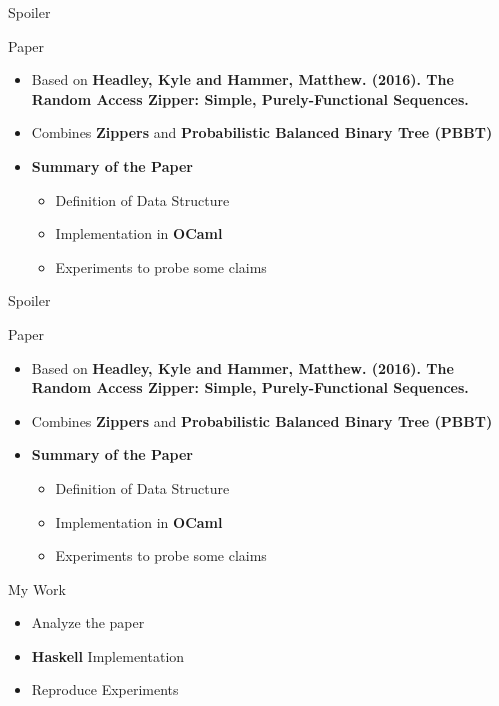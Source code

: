\documentclass{beamer}
\begin{document}
\begin{frame}[fragile]{Spoiler}

  \begin{block}{Paper}
    \begin{itemize}
      \item Based on \textbf{Headley, Kyle and Hammer, Matthew. (2016). The Random Access Zipper: Simple, Purely-Functional Sequences.}
      \item Combines \textbf{Zippers} and \textbf{Probabilistic Balanced Binary Tree (PBBT)}
      \item \textbf{Summary of the Paper}
        \begin{itemize}
            \item Definition of Data Structure
            \item Implementation in \textbf{OCaml}
            \item Experiments to probe some claims
        \end{itemize}
    \end{itemize}
  \end{block}

\end{frame}

\begin{frame}[fragile]{Spoiler}

  \begin{block}{Paper}
    \begin{itemize}
      \item Based on \textbf{Headley, Kyle and Hammer, Matthew. (2016). The Random Access Zipper: Simple, Purely-Functional Sequences.}
      \item Combines \textbf{Zippers} and \textbf{Probabilistic Balanced Binary Tree (PBBT)}
      \item \textbf{Summary of the Paper}
        \begin{itemize}
            \item Definition of Data Structure
            \item Implementation in \textbf{OCaml}
            \item Experiments to probe some claims
        \end{itemize}
    \end{itemize}
  \end{block}

    \begin{block}{My Work}
    \begin{itemize}
      \item Analyze the paper
      \item \textbf{Haskell} Implementation
      \item Reproduce Experiments
    \end{itemize}
  \end{block}

\end{frame}
\end{document}
